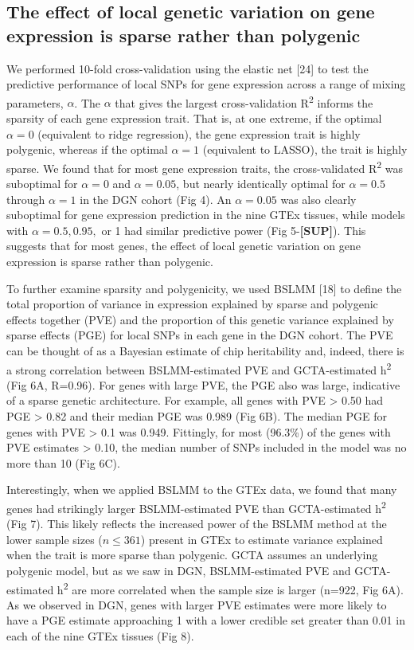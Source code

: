 \documentclass[]{article}
\begin{document}
\subsection{The effect of local genetic variation on gene expression is
sparse rather than
polygenic}\label{the-effect-of-local-genetic-variation-on-gene-expression-is-sparse-rather-than-polygenic}

We performed 10-fold cross-validation using the elastic net {[}24{]} to
test the predictive performance of local SNPs for gene expression across
a range of mixing parameters, \(\alpha\). The \(\alpha\) that gives the
largest cross-validation R\textsuperscript{2} informs the sparsity of
each gene expression trait. That is, at one extreme, if the optimal
\(\alpha=0\) (equivalent to ridge regression), the gene expression trait
is highly polygenic, whereas if the optimal \(\alpha=1\) (equivalent to
LASSO), the trait is highly sparse. We found that for most gene
expression traits, the cross-validated R\textsuperscript{2} was
suboptimal for \(\alpha=0\) and \(\alpha=0.05\), but nearly identically
optimal for \(\alpha=0.5\) through \(\alpha=1\) in the DGN cohort (Fig
4). An \(\alpha=0.05\) was also clearly suboptimal for gene expression
prediction in the nine GTEx tissues, while models with
\(\alpha=0.5,0.95,\) or 1 had similar predictive power (Fig
5-\textbf{{[}SUP{]}}). This suggests that for most genes, the effect of
local genetic variation on gene expression is sparse rather than
polygenic.

To further examine sparsity and polygenicity, we used BSLMM {[}18{]} to
define the total proportion of variance in expression explained by
sparse and polygenic effects together (PVE) and the proportion of this
genetic variance explained by sparse effects (PGE) for local SNPs in
each gene in the DGN cohort. The PVE can be thought of as a Bayesian
estimate of chip heritability and, indeed, there is a strong correlation
between BSLMM-estimated PVE and GCTA-estimated h\textsuperscript{2} (Fig
6A, R=0.96). For genes with large PVE, the PGE also was large,
indicative of a sparse genetic architecture. For example, all genes with
PVE \textgreater{} 0.50 had PGE \textgreater{} 0.82 and their median PGE
was 0.989 (Fig 6B). The median PGE for genes with PVE \textgreater{} 0.1
was 0.949. Fittingly, for most (96.3\%) of the genes with PVE estimates
\textgreater{} 0.10, the median number of SNPs included in the model was
no more than 10 (Fig 6C).

Interestingly, when we applied BSLMM to the GTEx data, we found that
many genes had strikingly larger BSLMM-estimated PVE than GCTA-estimated
h\textsuperscript{2} (Fig 7). This likely reflects the increased power
of the BSLMM method at the lower sample sizes (\(n \leq 361\)) present
in GTEx to estimate variance explained when the trait is more sparse
than polygenic. GCTA assumes an underlying polygenic model, but as we
saw in DGN, BSLMM-estimated PVE and GCTA-estimated h\textsuperscript{2}
are more correlated when the sample size is larger (n=922, Fig 6A). As
we observed in DGN, genes with larger PVE estimates were more likely to
have a PGE estimate approaching 1 with a lower credible set greater than
0.01 in each of the nine GTEx tissues (Fig 8).
\end{document}
